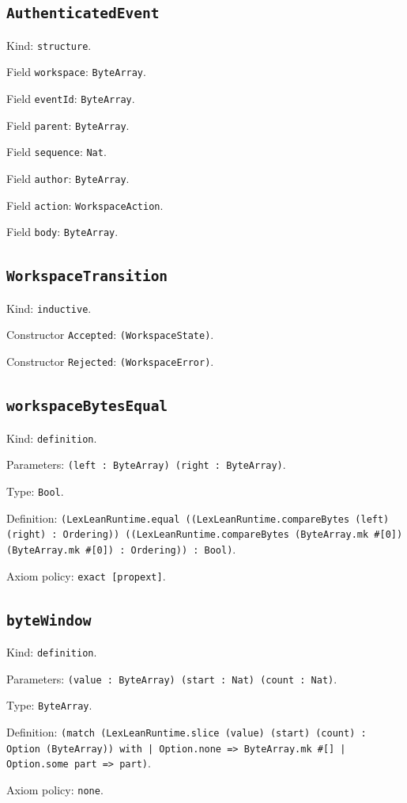 \documentclass[11pt]{article}
\begin{document}
\subsection*{\texttt{AuthenticatedEvent}}
\noindent Kind: \texttt{structure}.\par
\noindent Field \texttt{workspace}: \texttt{ByteArray}.\par
\noindent Field \texttt{eventId}: \texttt{ByteArray}.\par
\noindent Field \texttt{parent}: \texttt{ByteArray}.\par
\noindent Field \texttt{sequence}: \texttt{Nat}.\par
\noindent Field \texttt{author}: \texttt{ByteArray}.\par
\noindent Field \texttt{action}: \texttt{WorkspaceAction}.\par
\noindent Field \texttt{body}: \texttt{ByteArray}.\par
\subsection*{\texttt{WorkspaceTransition}}
\noindent Kind: \texttt{inductive}.\par
\noindent Constructor \texttt{Accepted}: \texttt{(WorkspaceState)}.\par
\noindent Constructor \texttt{Rejected}: \texttt{(WorkspaceError)}.\par
\subsection*{\texttt{workspaceBytesEqual}}
\noindent Kind: \texttt{definition}.\par
\noindent Parameters: \texttt{(left : ByteArray) (right : ByteArray)}.\par
\noindent Type: \texttt{Bool}.\par
\noindent Definition: \texttt{(LexLeanRuntime.equal ((LexLeanRuntime.compareBytes (left) (right) : Ordering)) ((LexLeanRuntime.compareBytes (ByteArray.mk \#[0]) (ByteArray.mk \#[0]) : Ordering)) : Bool)}.\par
\noindent Axiom policy: \texttt{exact [propext]}.\par
\subsection*{\texttt{byteWindow}}
\noindent Kind: \texttt{definition}.\par
\noindent Parameters: \texttt{(value : ByteArray) (start : Nat) (count : Nat)}.\par
\noindent Type: \texttt{ByteArray}.\par
\noindent Definition: \texttt{(match (LexLeanRuntime.slice (value) (start) (count) : Option (ByteArray)) with | Option.none => ByteArray.mk \#[] | Option.some part => part)}.\par
\noindent Axiom policy: \texttt{none}.\par
\end{document}
